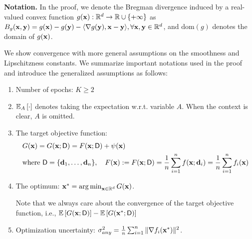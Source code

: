 \textbf{Notation.}
In the proof, we denote the Bregman divergence induced by a real-valued convex function $g({\mathbf{x}}): \mathbb{R}^d \rightarrow \mathbb{R} \cup \{+\infty\}$ as $B_g({\mathbf{x}}, {\mathbf{y}}) = g({\mathbf{x}}) - g({\mathbf{y}}) - \langle \nabla g({\mathbf{y}}), {\mathbf{x}} - {\mathbf{y}}\rangle, \forall {\mathbf{x}}, {\mathbf{y}} \in \mathbb{R}^d$, and $\text{dom}(g)$ denotes the domain of $g({\mathbf{x}})$. 


We show convergence with more general assumptions on the smoothness and Lipschitzness constants.
We summarize important notations used in the proof and introduce the generalized assumptions as follows:
\begin{enumerate}[itemsep=0mm]
    \item Number of epochs: $K \geq 2$

    \item $\mathbb{E}_{A}\left[\cdot\right]$ denotes taking the expectation w.r.t. variable $A$. When the context is clear, $A$ is omitted.

    \item The target objective function: 
    \begin{align}
    \label{eq:appendix_true_objective_def}
        &G({\mathbf{x}}) = G({\mathbf{x}}; {\mathsf{D}}) = F({\mathbf{x}}; {\mathsf{D}}) + \psi({\mathbf{x}})\\
        \nonumber
        &\text{where } {\mathsf{D}} = \{{\mathbf{d}}_1,\dots,{\mathbf{d}}_n\}, \quad 
        F({\mathbf{x}}) := F({\mathbf{x}}; {\mathsf{D}}) = \frac{1}{n}\sum_{i=1}^{n} f({\mathbf{x}}; {\mathbf{d}}_i) = \frac{1}{n}\sum_{i=1}^{n} f_i({\mathbf{x}})
    \end{align}

    \item The optimum: ${\mathbf{x}}^* = \operatorname*{arg\,min}_{{\mathbf{x}}\in\mathbb{R}^d} G({\mathbf{x}})$.

    Note that we always care about the convergence of the target objective function, i.e., $\mathbb{E}\left[G({\mathbf{x}}; {\mathsf{D}})\right] - \mathbb{E}\left[G({\mathbf{x}}^*; {\mathsf{D}})\right]$
    
    \item Optimization uncertainty: $\sigma_{any}^2 = \frac{1}{n}\sum_{i=1}^{n} \|\nabla f_i({\mathbf{x}}^*)\|^2$.

    


\end{enumerate}
